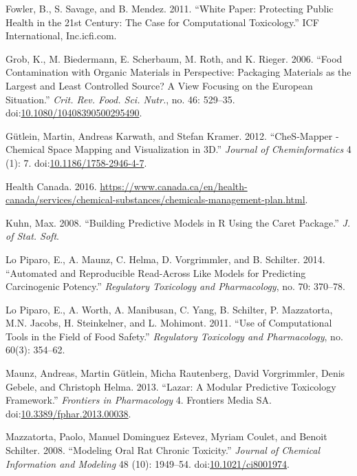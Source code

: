 \documentclass[]{achemso}
\begin{document}
\hypertarget{ref-Fowler2011}{}
Fowler, B., S. Savage, and B. Mendez. 2011. ``White Paper: Protecting
Public Health in the 21st Century: The Case for Computational
Toxicology.'' ICF International, Inc.icfi.com.

\hypertarget{ref-Grob2006}{}
Grob, K., M. Biedermann, E. Scherbaum, M. Roth, and K. Rieger. 2006.
``Food Contamination with Organic Materials in Perspective: Packaging
Materials as the Largest and Least Controlled Source? A View Focusing on
the European Situation.'' \emph{Crit. Rev. Food. Sci. Nutr.}, no. 46:
529--35.
doi:\href{https://doi.org/10.1080/10408390500295490}{10.1080/10408390500295490}.

\hypertarget{ref-Guetlein2012}{}
Gütlein, Martin, Andreas Karwath, and Stefan Kramer. 2012. ``CheS-Mapper
- Chemical Space Mapping and Visualization in 3D.'' \emph{Journal of
Cheminformatics} 4 (1): 7.
doi:\href{https://doi.org/10.1186/1758-2946-4-7}{10.1186/1758-2946-4-7}.

\hypertarget{ref-HealthCanada2016}{}
Health Canada. 2016.
\url{https://www.canada.ca/en/health-canada/services/chemical-substances/chemicals-management-plan.html}.

\hypertarget{ref-Kuhn08}{}
Kuhn, Max. 2008. ``Building Predictive Models in R Using the Caret
Package.'' \emph{J. of Stat. Soft}.

\hypertarget{ref-LoPiparo2014}{}
Lo Piparo, E., A. Maunz, C. Helma, D. Vorgrimmler, and B. Schilter.
2014. ``Automated and Reproducible Read-Across Like Models for
Predicting Carcinogenic Potency.'' \emph{Regulatory Toxicology and
Pharmacology}, no. 70: 370--78.

\hypertarget{ref-LoPiparo2011}{}
Lo Piparo, E., A. Worth, A. Manibusan, C. Yang, B. Schilter, P.
Mazzatorta, M.N. Jacobs, H. Steinkelner, and L. Mohimont. 2011. ``Use of
Computational Tools in the Field of Food Safety.'' \emph{Regulatory
Toxicology and Pharmacology}, no. 60(3): 354--62.

\hypertarget{ref-Maunz2013}{}
Maunz, Andreas, Martin Gütlein, Micha Rautenberg, David Vorgrimmler,
Denis Gebele, and Christoph Helma. 2013. ``Lazar: A Modular Predictive
Toxicology Framework.'' \emph{Frontiers in Pharmacology} 4. Frontiers
Media SA.
doi:\href{https://doi.org/10.3389/fphar.2013.00038}{10.3389/fphar.2013.00038}.

\hypertarget{ref-mazzatorta08}{}
Mazzatorta, Paolo, Manuel Dominguez Estevez, Myriam Coulet, and Benoit
Schilter. 2008. ``Modeling Oral Rat Chronic Toxicity.'' \emph{Journal of
Chemical Information and Modeling} 48 (10): 1949--54.
doi:\href{https://doi.org/10.1021/ci8001974}{10.1021/ci8001974}.
\end{document}
